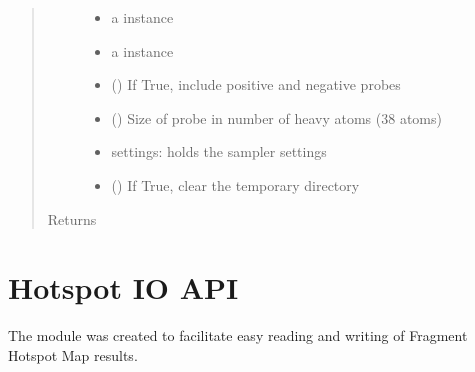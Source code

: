 \documentclass[letterpaper,10pt,english]{sphinxmanual}
\begin{document}
\begin{fulllineitems}
\begin{fulllineitems}
\begin{quote}
\begin{description}
\begin{itemize}
\item {} 
 \textendash{} a  instance

\item {} 
 \textendash{} a  instance

\item {} 
 () \textendash{} If True, include positive and negative probes

\item {} 
 () \textendash{} Size of probe in number of heavy atoms (3\sphinxhyphen{}8 atoms)

\item {} 
 \textendash{}  settings: holds the sampler settings

\item {} 
 () \textendash{} If True, clear the temporary directory

\end{itemize}

\item[{Returns}] \leavevmode


\end{description}\end{quote}

\end{fulllineitems}


\end{fulllineitems}



\chapter{Hotspot IO API}
\label{\detokenize{hs_io_api:module-hotspots.hs_io}}\label{\detokenize{hs_io_api:hotspot-io-api}}\label{\detokenize{hs_io_api::doc}}
The {\hyperref[\detokenize{hs_io_api:module-hotspots.hs_io}]{}} module was created to facilitate easy reading and
writing of Fragment Hotspot Map results.
\end{document}
